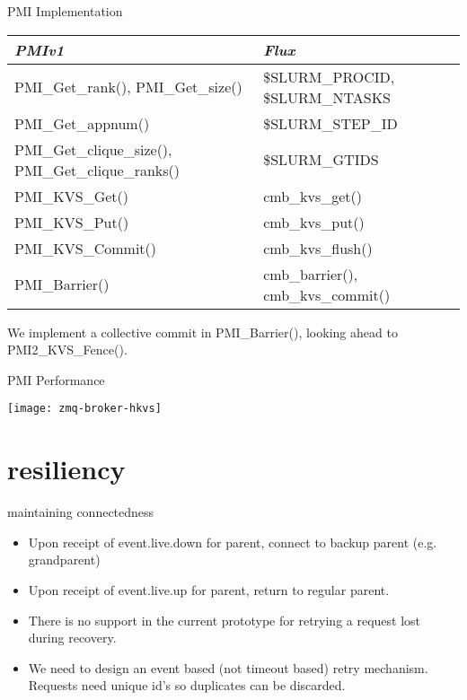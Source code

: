 \documentclass[default,pdf,colorBG,slideColor]{prosper}
\begin{document}
\begin{slide}{PMI Implementation}{\tiny
\begin{tabular}{|l|l|}
\hline
{\em PMIv1} & {\em Flux}\\
\hline
PMI\_Get\_rank(), PMI\_Get\_size() & \$SLURM\_PROCID, \$SLURM\_NTASKS\\
PMI\_Get\_appnum() & \$SLURM\_STEP\_ID\\
PMI\_Get\_clique\_size(), PMI\_Get\_clique\_ranks() & \$SLURM\_GTIDS\\
\hline
PMI\_KVS\_Get()    & cmb\_kvs\_get()\\
PMI\_KVS\_Put()    & cmb\_kvs\_put()\\
PMI\_KVS\_Commit() & cmb\_kvs\_flush()\\
PMI\_Barrier()     & cmb\_barrier(), cmb\_kvs\_commit()\\
\hline
\end{tabular}
We implement a collective commit in PMI\_Barrier(),
looking ahead to PMI2\_KVS\_Fence().
}\end{slide}

\begin{slide}{PMI Performance}{\small
\begin{center}
  \texttt{[image: zmq-broker-hkvs]}
\end{center}
}\end{slide}

\part{resiliency}

\begin{slide}{maintaining connectedness}{\small
\begin{itemize}
  \item{Upon receipt of event.live.down for parent, connect to backup parent
	(e.g. grandparent)}
  \item{Upon receipt of event.live.up for parent, return to regular parent.}
  \item{There is no support in the current prototype for retrying a request
        lost during recovery.}
  \item{We need to design an event based (not timeout based) retry mechanism.
        Requests need unique id's so duplicates can be discarded.}
\end{itemize}
}\end{slide}
\end{document}
